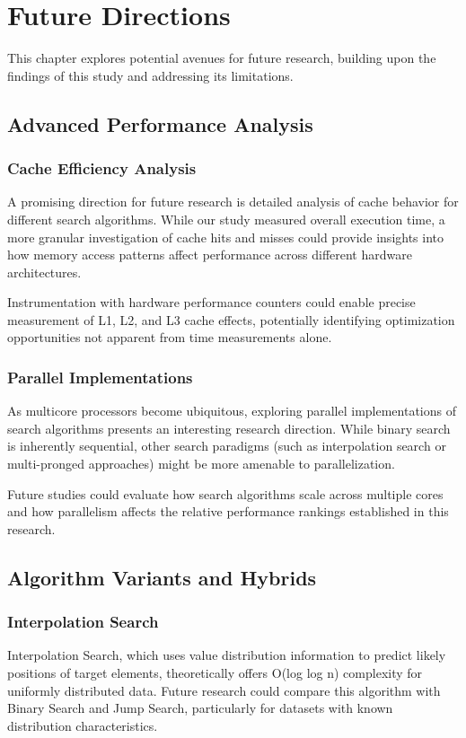 \chapter{Future Directions}

This chapter explores potential avenues for future research, building upon the findings of this study and addressing its limitations.

\section{Advanced Performance Analysis}

\subsection{Cache Efficiency Analysis}
A promising direction for future research is detailed analysis of cache behavior for different search algorithms. While our study measured overall execution time, a more granular investigation of cache hits and misses could provide insights into how memory access patterns affect performance across different hardware architectures.

Instrumentation with hardware performance counters could enable precise measurement of L1, L2, and L3 cache effects, potentially identifying optimization opportunities not apparent from time measurements alone.

\subsection{Parallel Implementations}
As multicore processors become ubiquitous, exploring parallel implementations of search algorithms presents an interesting research direction. While binary search is inherently sequential, other search paradigms (such as interpolation search or multi-pronged approaches) might be more amenable to parallelization.

Future studies could evaluate how search algorithms scale across multiple cores and how parallelism affects the relative performance rankings established in this research.

\section{Algorithm Variants and Hybrids}

\subsection{Interpolation Search}
Interpolation Search, which uses value distribution information to predict likely positions of target elements, theoretically offers O(log log n) complexity for uniformly distributed data. Future research could compare this algorithm with Binary Search and Jump Search, particularly for datasets with known distribution characteristics.

